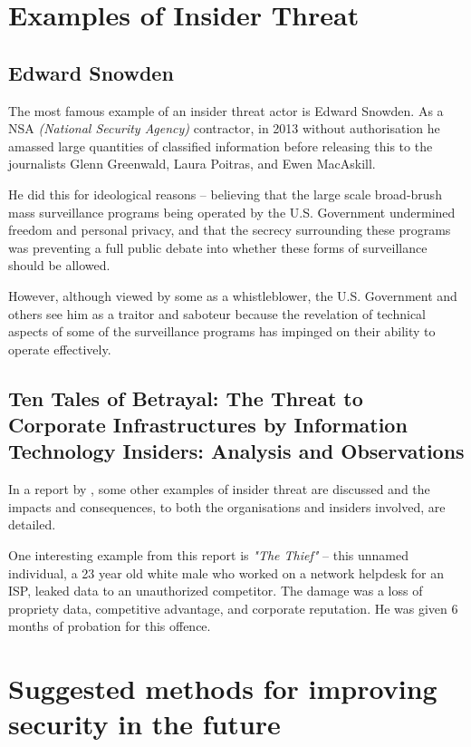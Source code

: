 \documentclass[12pt]{report}
\begin{document}
\section{Examples of Insider Threat}
\subsection*{Edward Snowden}
The most famous example of an insider threat actor is Edward Snowden. As a NSA \textit{(National Security Agency)} contractor, in 2013 without authorisation he amassed large quantities of classified information before releasing this to the journalists Glenn Greenwald, Laura Poitras, and Ewen MacAskill.

He did this for ideological reasons -- believing that the large scale broad-brush mass surveillance programs being operated by the U.S. Government undermined freedom and personal privacy, and that the secrecy surrounding these programs was preventing a full public debate into whether these forms of surveillance should be allowed.

However, although viewed by some as a whistleblower, the U.S. Government and others see him as a traitor and saboteur because the revelation of technical aspects of some of the surveillance programs has impinged on their ability to operate effectively.

\subsection*{Ten Tales of Betrayal: The Threat to Corporate Infrastructures by Information Technology Insiders: Analysis and Observations}
In a report by \cite{pdf:perserec:insider_threat_examples:200509}, some other examples of insider threat are discussed and the impacts and consequences, to both the organisations and insiders involved, are detailed.

One interesting example from this report is \textit{"The Thief"} -- this unnamed individual, a 23 year old white male who worked on a network helpdesk for an ISP, leaked data to an unauthorized competitor. The damage was a loss of propriety data, competitive advantage, and corporate reputation. He was given 6 months of probation for this offence.


\section{Suggested methods for improving security in the future}
\end{document}

